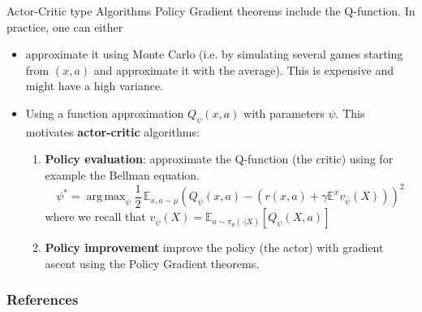\documentclass{beamer}
\DeclareMathOperator*{\argmax}{arg\,max}
\begin{document}
\begin{frame}{Actor-Critic type Algorithms}
Policy Gradient theorems include the Q-function. In practice, one can either 
\begin{itemize}
\item approximate it using Monte Carlo (i.e. by simulating several games starting from $(x,a)$ and approximate it with the average). This is expensive and might have a high variance. 
\item Using a function approximation $Q_\psi (x,a)$ with parameters $\psi$. This motivates \textbf{actor-critic} algorithms:

\begin{enumerate}
\item \textbf{Policy evaluation}: approximate the Q-function (the critic) using for example the Bellman equation.
\[
\psi^* = \argmax_{\psi}\frac1{2}\, \mathbb E_{x,a\sim \mu} \left(Q_\psi(x,a) - (r(x,a) + \gamma \mathbb E^x  v_{\bar \psi}(X)) \right)^2
\] 
where we recall that $v_{\bar \psi}(X) = \mathbb E_{a\sim \pi_\theta(\cdot|X)}[Q_\psi(X,a)] $
\item \textbf{Policy improvement} improve the policy (the actor) with gradient ascent using the Policy Gradient theorems. 
\end{enumerate}

\end{itemize}
\end{frame}




\begin{frame}[allowframebreaks]
\frametitle{References}


 
	
\end{frame}
\end{document}
